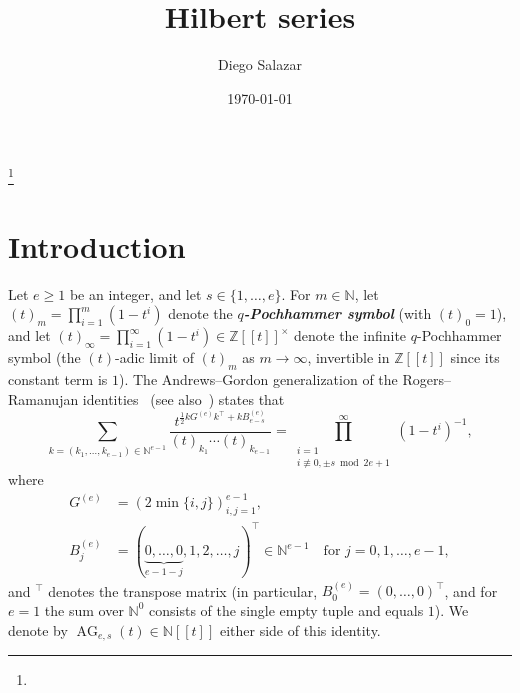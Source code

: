 \documentclass[a4paper, 12pt, reqno]{amsart}
\newcommand{\defterm}[1]{\textbf{\textit{#1}}\index{#1}}
\theoremstyle{remark}
\begin{document}
\title{Hilbert series}
\author{Diego Salazar}
\thanks{}
\address{Universidade Federal do Rio de Janeiro, Macaé, RJ, Brazil}
\date{\today}

\begin{abstract}
  
\end{abstract}


\maketitle

\section*{Introduction}
\label{sec:introduction}

Let $e \ge 1$ be an integer,
and let $s \in \{1, \dots, e\}$.
For $m \in \mathbb{N}$,
let $(t)_m = \prod_{i = 1}^m (1 - t^i)$ denote the \defterm{$q$-Pochhammer symbol} (with $(t)_0 = 1$),
and let $(t)_\infty = \prod_{i = 1}^\infty (1 - t^i) \in \mathbb{Z}[[t]]^\times$ denote the infinite $q$-Pochhammer symbol
(the $(t)$-adic limit of $(t)_m$ as $m \to \infty$, invertible in $\mathbb{Z}[[t]]$ since its constant term is $1$).
The Andrews--Gordon generalization of the Rogers--Ramanujan identities~\cite{gordon_combinatorial_1961, andrews_analytic_1974} (see also~\cite[Section~7.3, Theorems~7.5 and~7.8]{andrews_partitions_1976}) states that
\begin{equation*}
  \sum_{k = (k_1, \dots, k_{e - 1}) \in \mathbb{N}^{e - 1}}\frac{t^{\frac{1}{2}kG^{(e)}k^\top + kB^{(e)}_{e - s}}}{(t)_{k_1}\cdots(t)_{k_{e - 1}}} = \prod^\infty_{\substack{i = 1 \\ i \not\equiv 0, \pm s \bmod 2e + 1}}(1 - t^i)^{-1},
\end{equation*}
where
\begin{align*}
  G^{(e)} &= (2\min\{i, j\})_{i, j = 1}^{e - 1}, \\
  B^{(e)}_j &= (\underbrace{0, \dots, 0}_{e - 1 - j}, 1, 2, \dots, j)^\top \in \mathbb{N}^{e - 1} \quad \text{for $j = 0, 1, \dots, e - 1$},
\end{align*}
and ${}^\top$ denotes the transpose matrix (in particular, $B^{(e)}_0 = (0, \dots, 0)^\top$, and for $e = 1$ the sum over $\mathbb{N}^0$ consists of the single empty tuple and equals $1$).
We denote by $\operatorname{AG}_{e, s}(t) \in \mathbb{N}[[t]]$ either side of this identity.
\end{document}
